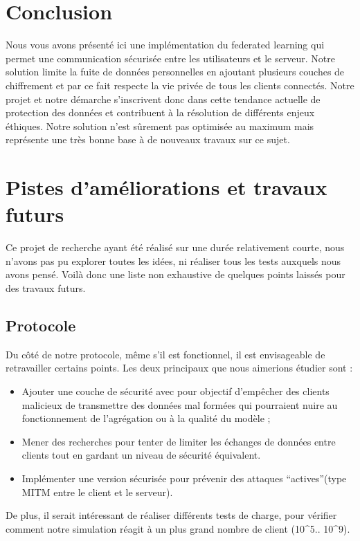 \documentclass{article}
\begin{document}
\section{Conclusion}
Nous vous avons présenté ici une implémentation du federated learning qui permet une communication sécurisée entre les utilisateurs et le serveur. Notre solution limite la fuite de données personnelles en ajoutant plusieurs couches de chiffrement et par ce fait respecte la vie privée de tous les clients connectés. Notre projet et notre démarche s’inscrivent donc dans cette tendance actuelle de protection des données et contribuent à la résolution de différents enjeux éthiques. 
Notre solution n’est sûrement pas optimisée au maximum mais représente une très bonne base à de nouveaux travaux sur ce sujet.

\section{Pistes d'améliorations et travaux futurs}
Ce projet de recherche ayant été réalisé sur une durée relativement courte, nous n'avons pas pu explorer toutes les idées, ni réaliser tous les tests auxquels nous avons pensé. Voilà donc une liste non exhaustive de quelques points laissés pour des travaux futurs.

\subsection{Protocole}
Du côté de notre protocole, même s'il est fonctionnel, il est envisageable de retravailler certains points. Les deux principaux que nous aimerions étudier sont :
\begin{itemize}
    \item Ajouter une couche de sécurité avec pour objectif d'empêcher des clients malicieux de transmettre des données mal formées qui pourraient nuire au fonctionnement de l'agrégation ou à la qualité du modèle ;
    \item Mener des recherches pour tenter de limiter les échanges de données entre clients tout en gardant un niveau de sécurité équivalent.
\item Implémenter une version sécurisée pour prévenir des attaques “actives”(type MITM entre le client et le serveur).
\end{itemize}

De plus, il serait intéressant de réaliser différents tests de charge, pour vérifier comment notre simulation réagit à un plus grand nombre de client (10^5.. 10^9).
\end{document}

